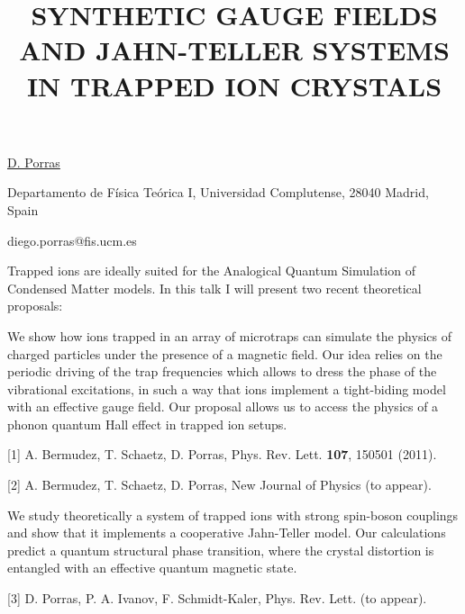 \title{SYNTHETIC GAUGE FIELDS AND JAHN-TELLER SYSTEMS IN TRAPPED ION CRYSTALS}

\underline{D. Porras} 

{\normalsize{\vspace{-4mm}
Departamento de F\'isica Te\'orica I,
Universidad Complutense,
28040 Madrid,
Spain

\email diego.porras@fis.ucm.es}}

Trapped ions are ideally suited for the Analogical Quantum Simulation of Condensed Matter models. In this talk I will present two recent theoretical proposals:

We show how ions trapped in an array of microtraps can simulate the physics of charged particles under the presence of a magnetic field. Our idea relies on the periodic driving of the trap frequencies which allows to dress the phase of the vibrational excitations, in such a way that ions implement a tight-biding model with an effective gauge field. Our proposal allows us to access the physics of a phonon quantum Hall effect in trapped ion setups.

{\normalsize
[1] A. Bermudez, T. Schaetz, D. Porras, Phys. Rev. Lett. \textbf{107}, 150501 (2011).
\vsp

[2] A. Bermudez, T. Schaetz, D. Porras, New Journal of Physics (to appear).
}

We study theoretically a system of trapped ions with strong spin-boson couplings and show that it implements a cooperative Jahn-Teller model. Our calculations predict a quantum structural phase transition, where the crystal distortion is entangled with an effective quantum magnetic state.

{\normalsize
[3] D. Porras, P. A. Ivanov, F. Schmidt-Kaler, Phys. Rev. Lett. (to appear).
}

\vspace{\baselineskip} 